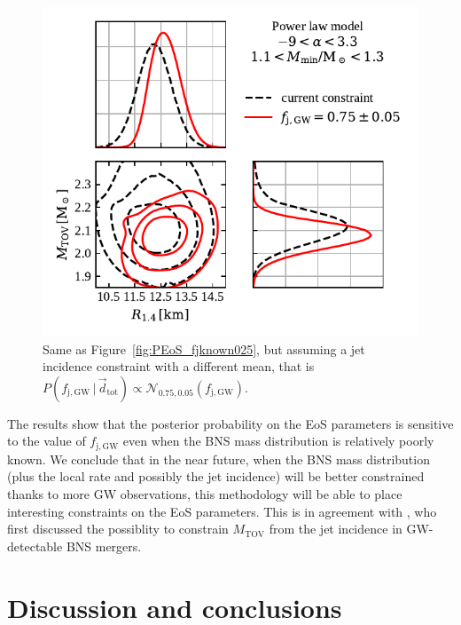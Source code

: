 \documentclass[]{aa}
\newcommand{\resp}[1]{#1}
\begin{document}
\begin{figure}
 \centering
 \includegraphics[width=\columnwidth]{figures/P_MTOV_R14_fjknown0.75.pdf}
 \caption{\resp{Same as Figure~\ref{fig:PEoS_fjknown025}, but assuming a jet incidence constraint with a different mean, that is $P(f_\mathrm{j,GW}\,|\,\vec d_\mathrm{tot})\propto \mathcal{N}_{0.75,0.05}(f_\mathrm{j,GW})$}.}  
 \label{fig:PEoS_fjknown075}
\end{figure} 
%
The results %
show that \resp{the posterior probability on the EoS parameters is sensitive to the value of $f_\mathrm{j,GW}$} even when the BNS mass distribution is \resp{relatively} poorly known.
% 
We conclude that in the near future, when the BNS mass distribution (plus the local rate and possibly the jet \resp{incidence}) will be better constrained thanks to more GW observations, this methodology will be able to place interesting constraints on the EoS parameters.
\resp{This is in agreement with \citealt{Fryer2015}, who first discussed the possiblity to constrain $M_\mathrm{TOV}$ from the jet incidence in GW-detectable BNS mergers.}
 
    
\section{Discussion and conclusions}
\label{sec:discussion}
\end{document}
